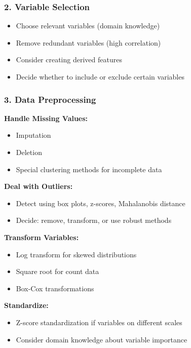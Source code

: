 \documentclass[
]{article}
\begin{document}
\subsubsection{2. Variable Selection}

\begin{itemize}
\item
  Choose relevant variables (domain knowledge)
\item
  Remove redundant variables (high correlation)
\item
  Consider creating derived features
\item
  Decide whether to include or exclude certain variables
\end{itemize}

\subsubsection{3. Data Preprocessing}

\textbf{Handle Missing Values:}

\begin{itemize}
\item
  Imputation
\item
  Deletion
\item
  Special clustering methods for incomplete data
\end{itemize}

\textbf{Deal with Outliers:}

\begin{itemize}
\item
  Detect using box plots, z-scores, Mahalanobis distance
\item
  Decide: remove, transform, or use robust methods
\end{itemize}

\textbf{Transform Variables:}

\begin{itemize}
\item
  Log transform for skewed distributions
\item
  Square root for count data
\item
  Box-Cox transformations
\end{itemize}

\textbf{Standardize:}

\begin{itemize}
\item
  Z-score standardization if variables on different scales
\item
  Consider domain knowledge about variable importance
\end{itemize}
\end{document}

